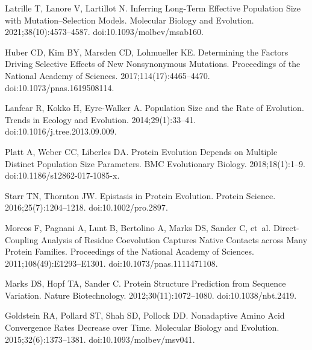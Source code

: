 \documentclass{article}
\begin{document}
\begin{thebibliography}{10}
        Latrille T, Lanore V, Lartillot N.
        \newblock Inferring Long-Term Effective Population Size with
        Mutation--Selection Models.
        \newblock Molecular Biology and Evolution. 2021;38(10):4573--4587.
        \newblock doi:{10.1093/molbev/msab160}.

        Huber CD, Kim BY, Marsden CD, Lohmueller KE.
        \newblock Determining the Factors Driving Selective Effects of New
        Nonsynonymous Mutations.
        \newblock Proceedings of the National Academy of Sciences.
        2017;114(17):4465--4470.
        \newblock doi:{10.1073/pnas.1619508114}.

        Lanfear R, Kokko H, {Eyre-Walker} A.
        \newblock Population Size and the Rate of Evolution.
        \newblock Trends in Ecology and Evolution. 2014;29(1):33--41.
        \newblock doi:{10.1016/j.tree.2013.09.009}.

        Platt A, Weber CC, Liberles DA.
        \newblock Protein Evolution Depends on Multiple Distinct Population Size
        Parameters.
        \newblock BMC Evolutionary Biology. 2018;18(1):1--9.
        \newblock doi:{10.1186/s12862-017-1085-x}.

        Starr TN, Thornton JW.
        \newblock Epistasis in Protein Evolution.
        \newblock Protein Science. 2016;25(7):1204--1218.
        \newblock doi:{10.1002/pro.2897}.

        Morcos F, Pagnani A, Lunt B, Bertolino A, Marks DS, Sander C, et~al.
        \newblock Direct-Coupling Analysis of Residue Coevolution Captures Native
        Contacts across Many Protein Families.
        \newblock Proceedings of the National Academy of Sciences.
        2011;108(49):E1293--E1301.
        \newblock doi:{10.1073/pnas.1111471108}.

        Marks DS, Hopf TA, Sander C.
        \newblock Protein Structure Prediction from Sequence Variation.
        \newblock Nature Biotechnology. 2012;30(11):1072--1080.
        \newblock doi:{10.1038/nbt.2419}.

        Goldstein RA, Pollard ST, Shah SD, Pollock DD.
        \newblock Nonadaptive {{Amino Acid Convergence Rates Decrease}} over {{Time}}.
        \newblock Molecular Biology and Evolution. 2015;32(6):1373--1381.
        \newblock doi:{10.1093/molbev/msv041}.


\end{thebibliography}
\end{document}
